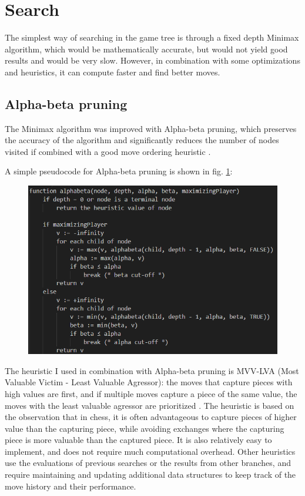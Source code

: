 \section{Search}
\label{sec:ch4sec2}

The simplest way of searching in the game tree is through a fixed depth Minimax algorithm, which would be mathematically accurate, but would not yield good results and would be very slow. However, in combination with some optimizations and heuristics, it can compute faster and find better moves.

\subsection{Alpha-beta pruning}
\label{subsec:ch4sec2subsec1}

The Minimax algorithm was improved with Alpha-beta pruning, which preserves the accuracy of the algorithm and significantly reduces the number of nodes visited if combined with a good move ordering heuristic \cite{eric1992analysis}.

A simple pseudocode for Alpha-beta pruning is shown in fig. \ref{fig:alphabetaPseudocode}:

\begin{figure}[h]
  \centering
  \includegraphics[scale=0.9]{figures/alphabeta-pseudocode.png}
  \label{fig:alphabetaPseudocode}
\end{figure}

The heuristic I used in combination with Alpha-beta pruning is MVV-LVA (Most Valuable Victim - Least Valuable Agressor): the moves that capture pieces with high values are first, and if multiple moves capture a piece of the same value, the moves with the least valuable agressor are prioritized \cite{mvv-lva}. The heuristic is based on the observation that in chess, it is often advantageous to capture pieces of higher value than the capturing piece, while avoiding exchanges where the capturing piece is more valuable than the captured piece. It is also relatively easy to implement, and does not require much computational overhead. Other heuristics use the evaluations of previous searches or the results from other branches, and require maintaining and updating additional data structures to keep track of the move history and their performance.

